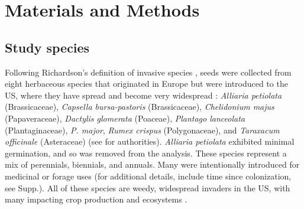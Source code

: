 \documentclass[11pt]{article}\usepackage[]{graphicx}\usepackage[]{color}
\begin{document}
	\section{Materials and Methods}
	\subsection{Study species}
	Following Richardson's definition of invasive species \parencite[][, see Supp. for details]{Richardson2000, Richardson2011}, seeds were collected from eight herbaceous species that originated in Europe but were introduced to the US, where they have spread and become very widespread  \parencite{Uva1997}:\textit{ Alliaria petiolata} (Brassicaceae), \textit{Capsella bursa-pastoris} (Brassicaceae), \textit{Chelidonium majus} (Papaveraceae), \textit{Dactylis glomerata} (Poaceae),  \textit{Plantago lanceolata} (Plantaginaceae), \textit{P.  major}, \textit{Rumex crispus} (Polygonaceae), and \textit{Taraxacum officinale} (Asteraceae) (see \textcite{Haines2011} for authorities). \textit{Alliaria petiolata} exhibited minimal germination, and so was removed from the analysis. These species represent a mix of perennials, biennials, and annuals. Many were intentionally introduced for medicinal or forage uses (for additional details, include time since colonization, see Supp.).  All of these species are weedy, widespread invaders in the US, with many impacting crop production and ecosystems \parencite[e.g.,][]{Froese2003,Wolfe2008}. 
\end{document}
